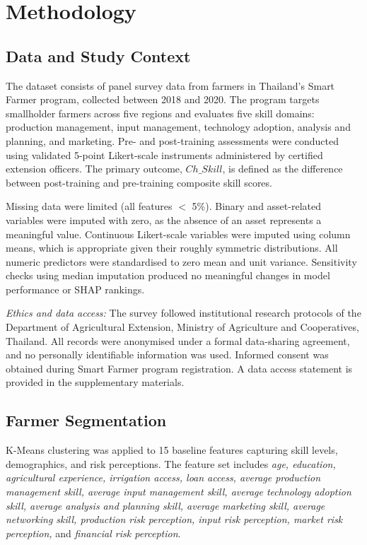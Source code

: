 \documentclass[3p,twocolumn,authoryear]{elsarticle}
\begin{document}
\section{Methodology}

\subsection{Data and Study Context}

The dataset consists of panel survey data from farmers in Thailand's Smart
Farmer program, collected between 2018 and 2020. The program targets
smallholder farmers across five regions and evaluates five skill domains:
production management, input management, technology adoption, analysis and
planning, and marketing. Pre- and post-training assessments were conducted
using validated 5-point Likert-scale instruments administered by certified
extension officers. The primary outcome, $Ch\_Skill$, is defined as the
difference between post-training and pre-training composite skill scores.

Missing data were limited (all features $<$ 5\%). Binary and asset-related
variables were imputed with zero, as the absence of an asset represents a
meaningful value. Continuous Likert-scale variables were imputed using column
means, which is appropriate given their roughly symmetric distributions. All
numeric predictors were standardised to zero mean and unit variance.
Sensitivity checks using median imputation produced no meaningful changes in
model performance or SHAP rankings.

\textit{Ethics and data access:}
The survey followed institutional research protocols of the Department of
Agricultural Extension, Ministry of Agriculture and Cooperatives, Thailand.
All records were anonymised under a formal data-sharing agreement, and no
personally identifiable information was used. Informed consent was obtained
during Smart Farmer program registration. A data access statement is provided
in the supplementary materials.

\subsection{Farmer Segmentation}

K-Means clustering \citep{macqueen1967} was applied to 15 baseline features
capturing skill levels, demographics, and risk perceptions. The feature set
includes \textit{age, education, agricultural experience, irrigation access,
loan access, average production management skill, average input management
skill, average technology adoption skill, average analysis and planning skill,
average marketing skill, average networking skill, production risk perception,
input risk perception, market risk perception,} and \textit{financial risk
perception}.
\end{document}
